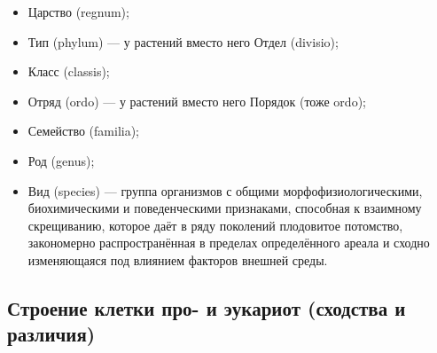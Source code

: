 \begin{itemize}
	\item Царство (regnum);
	
	\item Тип (phylum) --- у растений вместо него Отдел (divisio);
	
	\item Класс (classis);
	
	\item Отряд (ordo) --- у растений вместо него Порядок (тоже ordo);
	
	\item Семейство (familia);
	
	\item Род (genus);
	
	\item Вид (species) --- группа организмов с общими морфофизиологическими, биохимическими и поведенческими признаками, способная к взаимному скрещиванию, которое даёт в ряду поколений плодовитое потомство, закономерно распространённая в пределах определённого ареала и сходно изменяющаяся под влиянием факторов внешней среды.
\end{itemize}

\subsection{Строение клетки про- и эукариот (сходства и различия)}

